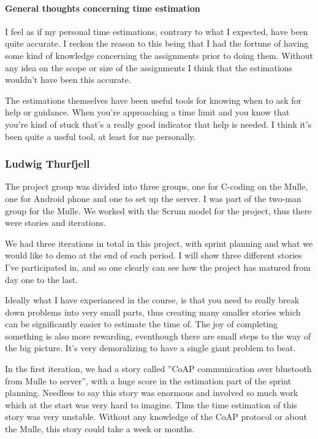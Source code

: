 \paragraph{General thoughts concerning time estimation}

I feel as if my personal time estimations, contrary to what I expected, have been quite accurate. I reckon the reason to this being that I had the fortune of having some kind of knowledge concerning the assignments prior to doing them. Without any idea on the scope or size of the assignments I think that the estimations wouldn't have been this accurate.

The estimations themselves have been useful tools for knowing when to ask for help or guidance. When you're approaching a time limit and you know that you're kind of stuck that's a really good indicator that help is needed. I think it's been quite a useful tool, at least for me personally.

\subsubsection{Ludwig Thurfjell}
The project group was divided into three groups, one for C-coding on the Mulle, one for Android phone
and one to set up the server. I was part of the two-man group for the Mulle. We worked with the Scrum model 
for the project, thus there were stories and iterations. 

We had three iterations in total in this project, with sprint planning and what we would like to demo at the 
end of each period. I will show three different stories I've participated in, and so one clearly can see
how the project has matured from day one to the last.

Ideally what I have experianced in the course, is that you need to really break down problems into very small
parts, thus creating many smaller stories which can be significantly easier to estimate the time of. The joy of completing
something is also more rewarding, eventhough there are small steps to the way of the big picture. It's very demoralizing to 
have a single giant problem to beat.

In the first iteration, we had a story called ''CoAP communication over bluetooth from Mulle to server'', with a huge score
in the estimation part of the sprint planning. Needless to say this story was enormous and involved so much work which at the start
was very hard to imagine. Thus the time estimation of this story was very unstable. Without any knowledge of the CoAP protocol or about the Mulle, this story could take a week or months.

